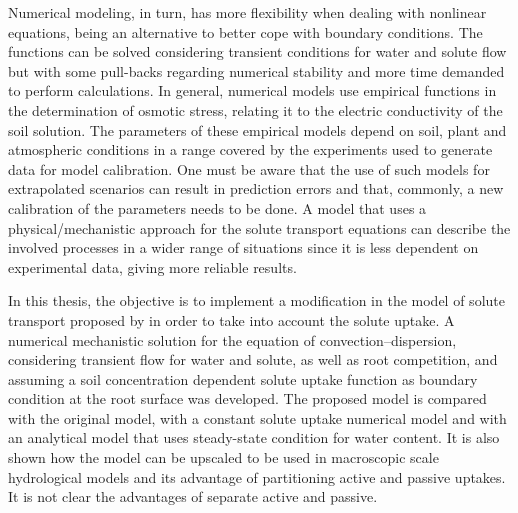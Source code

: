 Numerical modeling, in turn, has more flexibility when dealing with nonlinear equations, being an alternative to better cope with boundary conditions. 
The functions can be solved considering transient conditions for water and solute flow but with some pull-backs regarding numerical stability and more time demanded to perform calculations.
In general, numerical models use empirical functions in the determination of osmotic stress, relating it to the electric conductivity of the soil solution. 
The parameters of these empirical models depend on soil, plant and atmospheric conditions in a range covered by the experiments used to generate data for model calibration. 
One must be aware that the use of such models for extrapolated scenarios can result in prediction errors and that, commonly, a new calibration of the parameters needs to be done.
A model that uses a physical/mechanistic approach for the solute transport equations can describe the involved processes in a wider range of situations since it is less dependent on experimental data, giving more reliable results.


In this thesis, the objective is to 
implement a modification in the model of solute transport proposed by \citeonline[liersolute] in order to take into account the solute uptake.
A numerical mechanistic solution for the equation of convection--dispersion, considering transient flow for water and solute, as well as root competition, and assuming a soil concentration dependent solute uptake function as boundary condition at the root surface was developed.
The proposed model is compared with 
the original model,
with a constant solute uptake numerical model and with an analytical model that uses steady-state condition for water content. 
It is also shown how the model can be upscaled to be used in macroscopic scale hydrological models and its advantage of partitioning active and passive uptakes. 
{\localcolor \Red \quic It is not clear the advantages of separate active and passive.}
